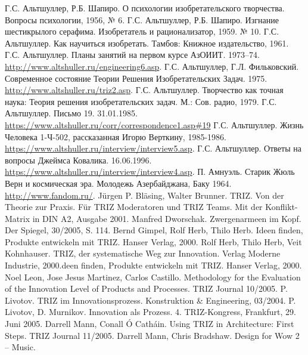 \begin{thebibliography}{xxx}
 Г.С. Альтшуллер, Р.Б. Шапиро. О психологии
  изобретательского творчества.  Вопросы психологии, 1956, № 6.
 Г.С. Альтшуллер, Р.Б. Шапиро. Изгнание шестикрылого
  серафима. Изобретатель и рационализатор, 1959. № 10.
 Г.С. Альтшуллер. Как научиться изобретать. Тамбов:
  Книжное издательство, 1961.
 Г.С. Альтшуллер. Планы занятий на первом курсе
  АзОИИТ.  1973--74. \url{http://www.altshuller.ru/engineering6.asp}.
 Г.С. Альтшуллер, Г.Л. Фильковский. Современное
  состояние Теории Решения Изобретательских Задач. 1975.
  \url{http://www.altshuller.ru/triz2.asp}.
 Г.С. Альтшуллер. Творчество как точная наука: Теория
  решения изобретательских задач. М.: Сов. радио, 1979.
 Г.С. Альтшуллер. Письмо 19.  31.01.1985.
  \url{https://www.altshuller.ru/corr/correspondence1.asp#19}
 Г.С. Альтшуллер. Жизнь Человека 1-Ч-502, рассказанная
  Игорю Верткину, 1985-1986.
  \url{https://www.altshuller.ru/interview/interview5.asp}.
 Г.С. Альтшуллер. Ответы на вопросы Джеймса Ковалика.
  16.06.1996.  \url{https://www.altshuller.ru/interview/interview4.asp}.
 П. Амнуэль. Старик Жюль Верн и космическая эра. Молодежь
    Азербайджана, Баку 1964.  \url{http://www.fandom.ru/}.
 Jürgen P. Bläsing, Walter Brunner. TRIZ. Von der
  Theorie zur Praxis. Für TRIZ Moderatoren und TRIZ Teams. Mit der
  Konflikt-Matrix in DIN A2, Ausgabe 2001.
 Manfred Dworschak. Zwergenarmeen im Kopf. Der
  Spiegel, 30/2005, S. 114.
 Bernd Gimpel, Rolf Herb, Thilo Herb. Ideen finden,
  Produkte entwickeln mit TRIZ. Hanser Verlag, 2000.
 Rolf Herb, Thilo Herb, Veit Kohnhauser. TRIZ, der
  systematische Weg zur Innovation. Verlag Moderne Industrie, 2000.deen finden,
  Produkte entwickeln mit TRIZ. Hanser Verlag, 2000.
 Noel Leon, Jose Jesus Martinez, Carlos Castillo.
  Methodology for the Evaluation of the Innovation Level of Products and
  Processes. TRIZ Journal 10/2005.
 P. Livotov. TRIZ im Innovationsprozess. Konstruktion \&
  Engineering, 03/2004.
 P. Livotov, D. Murnikov. Innovation als Prozess. 
  4. TRIZ-Kongress, Frankfurt, 29. Juni 2005. 
 Darrell Mann, Conall Ó Catháin.  Using TRIZ in
  Architecture: First Steps. TRIZ Journal 11/2005.
 Darrell Mann, Chris Bradshaw. Design for Wow 2 – Music.

\end{thebibliography}

